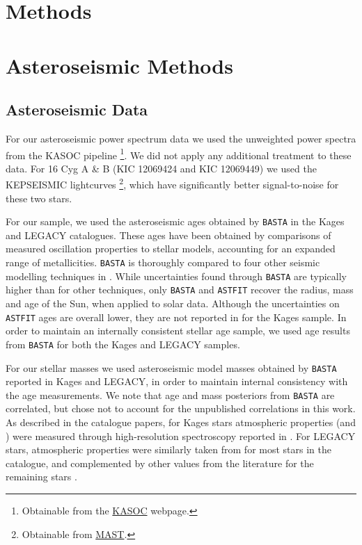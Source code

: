\section*{Methods}
\setcounter{tocdepth}{2}
\tableofcontents
\section{Asteroseismic Methods}
\subsection{Asteroseismic Data}
For our asteroseismic power spectrum data we used the unweighted power spectra from the KASOC pipeline \cite{handberg+lund2014}\footnote{Obtainable from the \href{http://kasoc.phys.au.dk/}{KASOC} webpage.}. We did not apply any additional treatment to these data. For 16 Cyg A \& B (KIC 12069424 and KIC 12069449) we used the KEPSEISMIC lightcurves \cite{garcia+2011}\footnote{Obtainable from \href{https://archive.
		stsci.edu/prepds/kepseismic/}{MAST}.}, which have significantly better signal-to-noise for these two stars.

For our sample, we used the asteroseismic ages obtained by \texttt{BASTA} \cite[BAyesian STellar Algorithm]{silvaaguirre+2015} in the Kages and LEGACY catalogues. These ages have been obtained by comparisons of measured oscillation properties to stellar models, accounting for an expanded range of metallicities. \texttt{BASTA} is thoroughly compared to four other seismic modelling techniques in \cite{silvaaguirre+2017}. While uncertainties found through \texttt{BASTA} are typically higher than for other techniques, only \texttt{BASTA} and \texttt{ASTFIT} \cite[Aarhus STellar Evolution Code]{christensen-dalsgaard2008} recover the radius, mass and age of the Sun, when applied to solar data. Although the uncertainties on \texttt{ASTFIT} ages are overall lower, they are not reported in \cite{silvaaguirre+2015} for the Kages sample. In order to maintain an internally consistent stellar age sample, we used age results from \texttt{BASTA} for both the Kages and LEGACY samples.

For our stellar masses we used asteroseismic model masses obtained by \texttt{BASTA} reported in Kages and LEGACY, in order to maintain internal consistency with the age measurements. We note that age and mass posteriors from \texttt{BASTA} are correlated, but chose not to account for the unpublished correlations in this work.
As described in the catalogue papers, for Kages stars atmospheric properties (\teff and \feh) were measured through high-resolution spectroscopy reported in \cite{huber+2013a}. For LEGACY stars, atmospheric properties were similarly taken from \cite{buchhave+latham2015} for most stars in the catalogue, and complemented by other values from the literature for the remaining stars \cite[see Table 3]{silvaaguirre+2017}.

